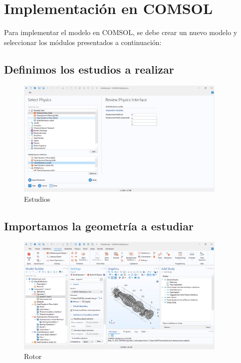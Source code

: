 \documentclass{article}
\theoremstyle{mytheoremstyle}
\theoremstyle{mytheoremstyle}
\theoremstyle{myproblemstyle}
\begin{document}
          \section{Implementación en COMSOL}
          Para implementar el modelo en COMSOL, se debe crear un nuevo modelo y seleccionar los módulos presentados a continuación:
\subsection{Definimos los estudios a realizar}
  \begin{figure}[H]
              \centering
              \includegraphics[width=0.9\textwidth]{estu.png}
              \caption{Estudios}
              \label{fig:comsol_estudios}
            \end{figure}
\subsection{Importamos la geometría a estudiar}
\begin{figure}[H]
              \centering
              \includegraphics[width=0.9\textwidth]{geom.png}
              \caption{Rotor}
              \label{fig:comsol_geometria_rotor} %
            \end{figure}
\end{document}
